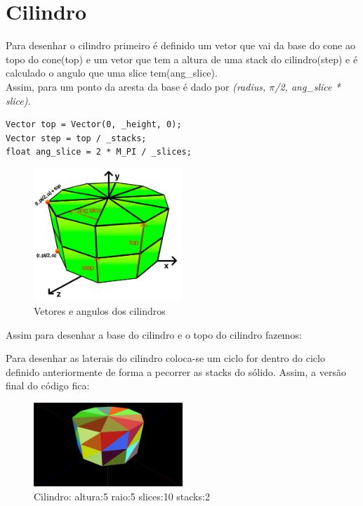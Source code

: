 \documentclass[a4paper]{report}
\begin{document}
\section{Cilindro}
Para desenhar o cilindro primeiro é definido um vetor que vai da base do cone ao
topo do cone(top) e um vetor que tem a altura de uma stack do cilindro(step) e
é calculado o angulo que uma slice tem(ang\_slice).\\
Assim, para um ponto da aresta da base é dado por \textit{(radius, $\pi$/2,
ang\_slice * slice)}.
\begin{lstlisting}
Vector top = Vector(0, _height, 0);
Vector step = top / _stacks;
float ang_slice = 2 * M_PI / _slices;
\end{lstlisting}
\begin{figure}[H]
    \centering 
    \includegraphics[width=0.5\textwidth]{images/cilindro_vetores.png}  
    \caption{Vetores e angulos dos cilindros}
    \label{fig:cilindro_vec}
\end{figure}
Assim para desenhar a base do cilindro e o topo do cilindro fazemos:


Para desenhar as laterais do cilindro coloca-se um ciclo for dentro do
ciclo definido anteriormente de forma a pecorrer as stacks do sólido.
Assim, a versão final do código fica:




\begin{figure}[H]
    \centering 
    \includegraphics[width=0.5\textwidth]{images/cylinder.png}  
    \caption{Cilindro: altura:5 raio:5 slices:10 stacks:2}
    \label{fig:cilindro_render}
\end{figure}
\end{document}
